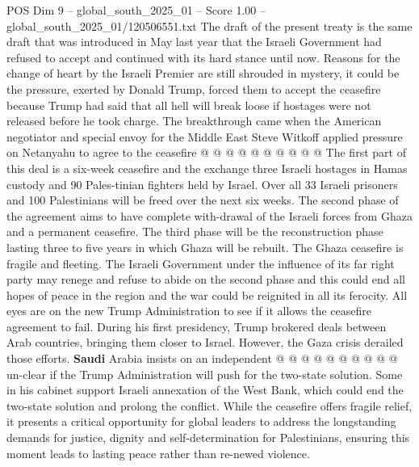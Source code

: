\begin{textsample}{POS Dim 9 – global\_south\_2025\_01 – Score 1.00 – global\_south\_2025\_01/120506551.txt}
The draft of the present treaty is the same draft that was introduced in May last year that the Israeli Government had refused to accept and continued with its hard stance until now.
Reasons for the change of heart by the Israeli Premier are still shrouded in mystery, it could be the pressure, exerted by Donald Trump, forced them to accept the ceasefire because Trump had said that all hell will break loose if hostages were not released before he took charge.
The breakthrough came when the American negotiator and special envoy for the Middle East Steve Witkoff applied pressure on Netanyahu to agree to the ceasefire @ @ @ @ @ @ @ @ @ @ The first part of this deal is a six-week ceasefire and the exchange three Israeli hostages in Hamas custody and 90 Pales-tinian fighters held by Israel.
Over all 33 Israeli prisoners and 100 Palestinians will be freed over the next six weeks.
The second phase of the agreement aims to have complete with-drawal of the Israeli forces from Ghaza and a permanent ceasefire.
The third phase will be the reconstruction phase lasting three to five years in which Ghaza will be rebuilt.
The Ghaza ceasefire is fragile and fleeting.
The Israeli Government under the influence of its far right party may renege and refuse to abide on the second phase and this could end all hopes of peace in the region and the war could be reignited in all its ferocity.
All eyes are on the new Trump Administration to see if it allows the ceasefire agreement to fail.
During his first presidency, Trump brokered deals between Arab countries, bringing them closer to Israel.
However, the Gaza crisis derailed those efforts. \textbf{Saudi} Arabia insists on an independent @ @ @ @ @ @ @ @ @ @ un-clear if the Trump Administration will push for the two-state solution.
Some in his cabinet support Israeli annexation of the West Bank, which could end the two-state solution and prolong the conflict.
While the ceasefire offers fragile relief, it presents a critical opportunity for global leaders to address the longstanding demands for justice, dignity and self-determination for Palestinians, ensuring this moment leads to lasting peace rather than re-newed violence.

\end{textsample}
